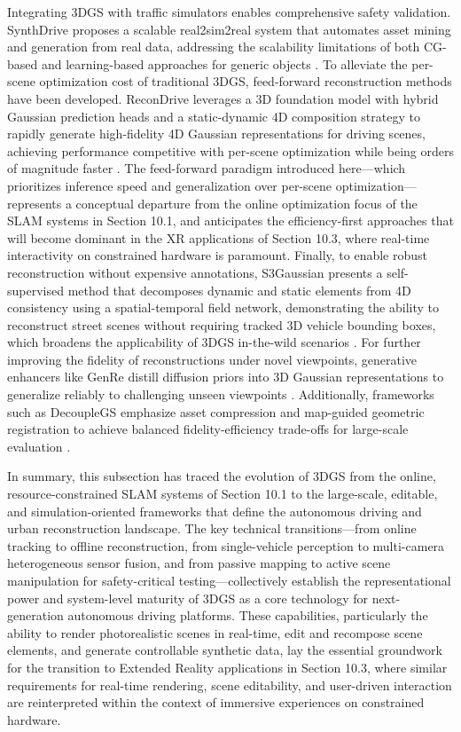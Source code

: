 \documentclass[11pt]{article}
\begin{document}
Integrating 3DGS with traffic simulators enables comprehensive safety validation. SynthDrive proposes a scalable real2sim2real system that automates asset mining and generation from real data, addressing the scalability limitations of both CG-based and learning-based approaches for generic objects \cite{ref671}. To alleviate the per-scene optimization cost of traditional 3DGS, feed-forward reconstruction methods have been developed. ReconDrive leverages a 3D foundation model with hybrid Gaussian prediction heads and a static-dynamic 4D composition strategy to rapidly generate high-fidelity 4D Gaussian representations for driving scenes, achieving performance competitive with per-scene optimization while being orders of magnitude faster \cite{ref672}. The feed-forward paradigm introduced here---which prioritizes inference speed and generalization over per-scene optimization---represents a conceptual departure from the online optimization focus of the SLAM systems in Section 10.1, and anticipates the efficiency-first approaches that will become dominant in the XR applications of Section 10.3, where real-time interactivity on constrained hardware is paramount. Finally, to enable robust reconstruction without expensive annotations, S3Gaussian presents a self-supervised method that decomposes dynamic and static elements from 4D consistency using a spatial-temporal field network, demonstrating the ability to reconstruct street scenes without requiring tracked 3D vehicle bounding boxes, which broadens the applicability of 3DGS in-the-wild scenarios \cite{ref673}. For further improving the fidelity of reconstructions under novel viewpoints, generative enhancers like GenRe distill diffusion priors into 3D Gaussian representations to generalize reliably to challenging unseen viewpoints \cite{ref674}. Additionally, frameworks such as DecoupleGS emphasize asset compression and map-guided geometric registration to achieve balanced fidelity-efficiency trade-offs for large-scale evaluation \cite{ref666}.

In summary, this subsection has traced the evolution of 3DGS from the online, resource-constrained SLAM systems of Section 10.1 to the large-scale, editable, and simulation-oriented frameworks that define the autonomous driving and urban reconstruction landscape. The key technical transitions---from online tracking to offline reconstruction, from single-vehicle perception to multi-camera heterogeneous sensor fusion, and from passive mapping to active scene manipulation for safety-critical testing---collectively establish the representational power and system-level maturity of 3DGS as a core technology for next-generation autonomous driving platforms. These capabilities, particularly the ability to render photorealistic scenes in real-time, edit and recompose scene elements, and generate controllable synthetic data, lay the essential groundwork for the transition to Extended Reality applications in Section 10.3, where similar requirements for real-time rendering, scene editability, and user-driven interaction are reinterpreted within the context of immersive experiences on constrained hardware.
\end{document}
